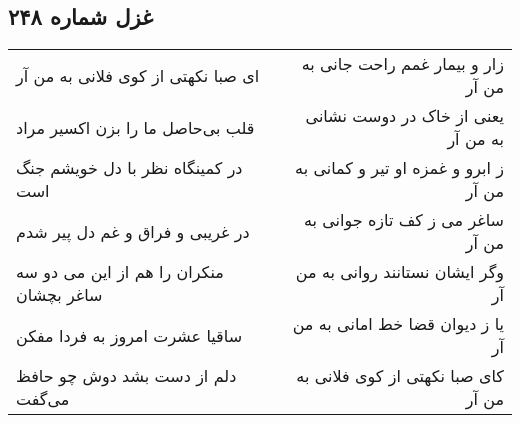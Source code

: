 \begin{center}
\section*{غزل شماره ۲۴۸}
\label{sec:sh248}
\begin{longtable}{l p{0.5cm} r}
ای صبا نکهتی از کوی فلانی به من آر
&&
زار و بیمار غمم راحت جانی به من آر
\\
قلب بی‌حاصل ما را بزن اکسیر مراد
&&
یعنی از خاک در دوست نشانی به من آر
\\
در کمینگاه نظر با دل خویشم جنگ است
&&
ز ابرو و غمزه او تیر و کمانی به من آر
\\
در غریبی و فراق و غم دل پیر شدم
&&
ساغر می ز کف تازه جوانی به من آر
\\
منکران را هم از این می دو سه ساغر بچشان
&&
وگر ایشان نستانند روانی به من آر
\\
ساقیا عشرت امروز به فردا مفکن
&&
یا ز دیوان قضا خط امانی به من آر
\\
دلم از دست بشد دوش چو حافظ می‌گفت
&&
کای صبا نکهتی از کوی فلانی به من آر
\\
\end{longtable}
\end{center}

